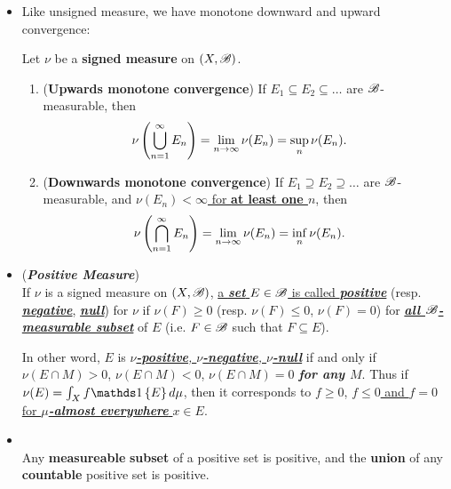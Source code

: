 \documentclass[11pt]{article}
\begin{document}
\begin{itemize}
\item Like unsigned measure, we have monotone downward and upward convergence: 
\begin{proposition} 
Let $\nu$ be a \textbf{signed measure} on $(X, {\mathscr B})$.
\begin{enumerate}
\item (\textbf{Upwards monotone convergence}) If $E_1 \subseteq E_2 \subseteq \ldots$ are ${\mathscr B}$-measurable, then
\begin{align}
\nu\left(\bigcup_{n=1}^{\infty} E_n\right) &= \lim\limits_{n\rightarrow \infty}\nu(E_n) = \sup\limits_{n}\nu(E_n). \label{eqn: signed_measure_upward_monotone_convergence}
\end{align}
\item (\textbf{Downwards monotone convergence}) If $E_1 \supseteq E_2 \supseteq \ldots$ are ${\mathscr B}$-measurable, and \underline{$\nu(E_n) < \infty$ for \textbf{at least one $n$}}, then
\begin{align}
\nu\left(\bigcap_{n=1}^{\infty} E_n\right) &= \lim\limits_{n\rightarrow \infty}\nu(E_n) = \inf\limits_{n}\nu(E_n). \label{eqn: signed_measure_downward_monotone_convergence}
\end{align}
\end{enumerate}
\end{proposition}



\item \begin{definition} (\emph{\textbf{Positive Measure}})\\
If $\nu$ is a signed measure on $(X,{\mathscr B})$, \underline{a \textbf{\emph{set}} $E\in {\mathscr B}$ is called \emph{\textbf{positive}}} (resp. \underline{\emph{\textbf{negative}}}, \underline{\emph{\textbf{null}}}) for $\nu$ if $\nu(F)\ge 0$ (resp. $\nu(F)\le 0$, $\nu(F)= 0$) for \underline{\emph{\textbf{all ${\mathscr B}$-measurable subset}}} of $E$ (i.e. $F\in {\mathscr B}$ such that $F\subseteq E$).  

In other word, $E$ is \underline{\emph{\textbf{$\nu$-positive}, \textbf{$\nu$-negative}, \textbf{$\nu$-null}}}  if and only if $\nu(E\cap M)>0$, $\nu(E\cap M)<0$, $\nu(E\cap M)=0$ \emph{\textbf{for any $M$}}. Thus if  $\nu(E) = \int_{X}f\ind{E} d\mu $, then it corresponds to \underline{$f\ge 0$}, \underline{$f\le 0$ and $f=0$ for \emph{\textbf{$\mu$-almost everywhere}} $x\in E$}.
\end{definition}

\item \begin{lemma}\citep{folland2013real}\\
Any \textbf{measureable} \textbf{subset} of a positive set is positive, and the \textbf{union} of any \textbf{countable} positive set is positive. 
\end{lemma}


\end{itemize}
\end{document}
